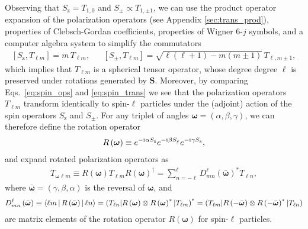 \documentclass[a4paper,twocolumn,unpublished]{quantumarticle}
\newcommand{\p}[1]{\left(#1\right)} %
\renewcommand{\sp}[1]{\left[#1\right]} %
\newcommand{\bk}{\Braket} %
\renewcommand{\i}{\mathrm{i}\mkern1mu} %
\newcommand{\y}{\text{y}}
\newcommand{\z}{\text{z}}
\def\obk#1{\mathinner{({#1})}}
\begin{document}
Observing that $S_\z=T_{1,0}$ and $S_\pm\propto T_{1,\pm1}$, we can use the product operator expansion of the polarization operators (see Appendix \ref{sec:trans_prod}), properties of Clebsch-Gordan coefficients, properties of Wigner $6$-$j$ symbols, and a computer algebra system to simplify the commutators
\begin{align}
  \sp{S_\z,T_{\ell m}} = m\, T_{\ell m},
  &&
  \sp{S_\pm,T_{\ell m}} = \sqrt{\ell\p{\ell+1}-m\p{m\pm 1}}\, T_{\ell,m\pm1},
  \label{eq:spin_trans}
\end{align}
which implies that $T_{\ell m}$ is a spherical tensor operator, whose degree degree $\ell$ is preserved under rotations generated by $\bm S$.
Moreover, by comparing Eqs.~\eqref{eq:spin_ops} and \eqref{eq:spin_trans} we see that the polarization operators $T_{\ell m}$ transform identically to spin-$\ell$ particles under the (adjoint) action of the spin operators $S_\z$ and $S_\pm$.
For any triplet of angles $\bm\omega=\p{\alpha,\beta,\gamma}$, we can therefore define the rotation operator
\begin{align}
  R\p{\bm\omega} \equiv
  e^{-\i\alpha S_\z} e^{-\i\beta S_\y} e^{-\i\gamma S_\z},
\end{align}
and expand rotated polarization operators as
\begin{align}
  T_{\bm\omega\ell m} \equiv
  R\p{\bm\omega} T_{\ell m} R\p{\bm\omega}^\dag
  = \sum_{n=-\ell}^\ell D_{mn}^\ell\p{\bar{\bm\omega}}^* T_{\ell n},
  \label{eq:trans_rot_apndx}
\end{align}
where $\bar{\bm\omega}=\p{\gamma,\beta,\alpha}$ is the reversal of $\bm\omega$, and
\begin{align}
  D_{mn}^\ell\p{\bar{\bm\omega}}
  \equiv \bk{\ell m|R\p{\bar{\bm\omega}}|\ell n}
  = \obk{T_{\ell n} | R\p{\bm\omega}
    \otimes R\p{\bm\omega}^* |T_{\ell m}}^*
  = \obk{T_{\ell m} | R\p{-\bar{\bm\omega}}
    \otimes R\p{-\bar{\bm\omega}}^* |T_{\ell n}}
\end{align}
are matrix elements of the rotation operator $R\p{\bm\omega}$ for spin-$\ell$ particles.
\end{document}

